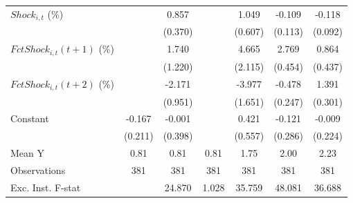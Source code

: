{\begin{tabular}{l*{6}{c}}
\addlinespace
$ Shock_{i,t}$ (\%) &                     &       0.857\sym{**} &                     &       1.049\sym{*}  &      -0.109         &      -0.118         \\
                    &                     &     (0.370)         &                     &     (0.607)         &     (0.113)         &     (0.092)         \\
\addlinespace
$ FctShock_{i,t}(t+1)$ (\%)&                     &       1.740         &                     &       4.665\sym{**} &       2.769\sym{***}&       0.864\sym{*}  \\
                    &                     &     (1.220)         &                     &     (2.115)         &     (0.454)         &     (0.437)         \\
\addlinespace
$ FctShock_{i,t}(t+2)$ (\%)&                     &      -2.171\sym{**} &                     &      -3.977\sym{**} &      -0.478\sym{*}  &       1.391\sym{***}\\
                    &                     &     (0.951)         &                     &     (1.651)         &     (0.247)         &     (0.301)         \\
\addlinespace
Constant            &      -0.167         &      -0.001         &                     &       0.421         &      -0.121         &      -0.009         \\
                    &     (0.211)         &     (0.398)         &                     &     (0.557)         &     (0.286)         &     (0.224)         \\
\midrule
Mean Y              &        0.81         &        0.81         &        0.81         &        1.75         &        2.00         &        2.23         \\
Observations        &         381         &         381         &         381         &         381         &         381         &         381         \\
Exc. Inst. F-stat   &                     &      24.870         &       1.028         &      35.759         &      48.081         &      36.688         \\
\bottomrule
\end{tabular}
}
